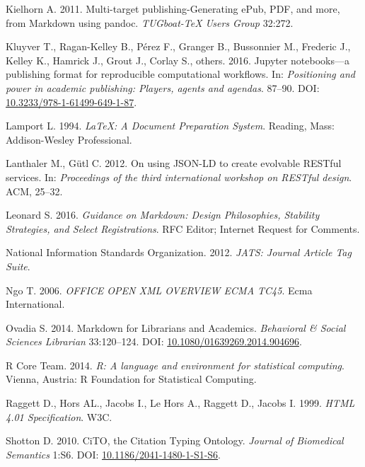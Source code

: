 \documentclass[10pt,fleqn]{wlpeerj}
\begin{document}
\hypertarget{ref-kielhornux5fmultiux5f2011}{}
Kielhorn A. 2011. Multi-target publishing-Generating ePub, PDF, and
more, from Markdown using pandoc. \emph{TUGboat-TeX Users Group} 32:272.

\hypertarget{ref-kluyverux5fjupyterux5f2016}{}
Kluyver T., Ragan-Kelley B., Pérez F., Granger B., Bussonnier M.,
Frederic J., Kelley K., Hamrick J., Grout J., Corlay S., others. 2016.
Jupyter notebooks---a publishing format for reproducible computational
workflows. In: \emph{Positioning and power in academic publishing:
Players, agents and agendas}. 87--90. DOI:
\href{https://doi.org/10.3233/978-1-61499-649-1-87}{10.3233/978-1-61499-649-1-87}.

\hypertarget{ref-lamportux5flatex:ux5f1994}{}
Lamport L. 1994. \emph{LaTeX: A Document Preparation System}. Reading,
Mass: Addison-Wesley Professional.

\hypertarget{ref-lanthalerux5fjsonldux5f2012}{}
Lanthaler M., Gütl C. 2012. On using JSON-LD to create evolvable RESTful
services. In: \emph{Proceedings of the third international workshop on
RESTful design}. ACM, 25--32.

\hypertarget{ref-rfc7764}{}
Leonard S. 2016. \emph{Guidance on Markdown: Design Philosophies,
Stability Strategies, and Select Registrations}. RFC Editor; Internet
Request for Comments.

\hypertarget{ref-JATS}{}
National Information Standards Organization. 2012. \emph{JATS: Journal
Article Tag Suite}.

\hypertarget{ref-OOXML}{}
Ngo T. 2006. \emph{OFFICE OPEN XML OVERVIEW ECMA TC45}. Ecma
International.

\hypertarget{ref-ovadiaux5fmarkdownux5f2014}{}
Ovadia S. 2014. Markdown for Librarians and Academics. \emph{Behavioral
\& Social Sciences Librarian} 33:120--124. DOI:
\href{https://doi.org/10.1080/01639269.2014.904696}{10.1080/01639269.2014.904696}.

\hypertarget{ref-Rux5f2014}{}
R Core Team. 2014. \emph{R: A language and environment for statistical
computing}. Vienna, Austria: R Foundation for Statistical Computing.

\hypertarget{ref-HTML4}{}
Raggett D., Hors AL., Jacobs I., Le Hors A., Raggett D., Jacobs I. 1999.
\emph{HTML 4.01 Specification}. W3C.

\hypertarget{ref-shottonux5fcitoux5f2010}{}
Shotton D. 2010. CiTO, the Citation Typing Ontology. \emph{Journal of
Biomedical Semantics} 1:S6. DOI:
\href{https://doi.org/10.1186/2041-1480-1-S1-S6}{10.1186/2041-1480-1-S1-S6}.
\end{document}
